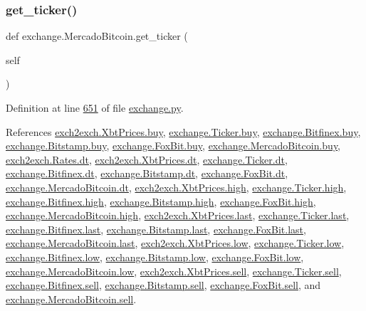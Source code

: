\subsubsection{\texorpdfstring{get\+\_\+ticker()}{get\_ticker()}}
{\footnotesize\ttfamily def exchange.\+Mercado\+Bitcoin.\+get\+\_\+ticker (\begin{DoxyParamCaption}\item[{}]{self }\end{DoxyParamCaption})}



Definition at line \hyperlink{exchange_8py_source_l00651}{651} of file \hyperlink{exchange_8py_source}{exchange.\+py}.



References \hyperlink{exch2exch_8py_source_l00059}{exch2exch.\+Xbt\+Prices.\+buy}, \hyperlink{exchange_8py_source_l00060}{exchange.\+Ticker.\+buy}, \hyperlink{exchange_8py_source_l00430}{exchange.\+Bitfinex.\+buy}, \hyperlink{exchange_8py_source_l00502}{exchange.\+Bitstamp.\+buy}, \hyperlink{exchange_8py_source_l00574}{exchange.\+Fox\+Bit.\+buy}, \hyperlink{exchange_8py_source_l00642}{exchange.\+Mercado\+Bitcoin.\+buy}, \hyperlink{exch2exch_8py_source_l00028}{exch2exch.\+Rates.\+dt}, \hyperlink{exch2exch_8py_source_l00057}{exch2exch.\+Xbt\+Prices.\+dt}, \hyperlink{exchange_8py_source_l00059}{exchange.\+Ticker.\+dt}, \hyperlink{exchange_8py_source_l00437}{exchange.\+Bitfinex.\+dt}, \hyperlink{exchange_8py_source_l00509}{exchange.\+Bitstamp.\+dt}, \hyperlink{exchange_8py_source_l00573}{exchange.\+Fox\+Bit.\+dt}, \hyperlink{exchange_8py_source_l00649}{exchange.\+Mercado\+Bitcoin.\+dt}, \hyperlink{exch2exch_8py_source_l00061}{exch2exch.\+Xbt\+Prices.\+high}, \hyperlink{exchange_8py_source_l00062}{exchange.\+Ticker.\+high}, \hyperlink{exchange_8py_source_l00432}{exchange.\+Bitfinex.\+high}, \hyperlink{exchange_8py_source_l00504}{exchange.\+Bitstamp.\+high}, \hyperlink{exchange_8py_source_l00576}{exchange.\+Fox\+Bit.\+high}, \hyperlink{exchange_8py_source_l00644}{exchange.\+Mercado\+Bitcoin.\+high}, \hyperlink{exch2exch_8py_source_l00063}{exch2exch.\+Xbt\+Prices.\+last}, \hyperlink{exchange_8py_source_l00064}{exchange.\+Ticker.\+last}, \hyperlink{exchange_8py_source_l00434}{exchange.\+Bitfinex.\+last}, \hyperlink{exchange_8py_source_l00506}{exchange.\+Bitstamp.\+last}, \hyperlink{exchange_8py_source_l00578}{exchange.\+Fox\+Bit.\+last}, \hyperlink{exchange_8py_source_l00646}{exchange.\+Mercado\+Bitcoin.\+last}, \hyperlink{exch2exch_8py_source_l00062}{exch2exch.\+Xbt\+Prices.\+low}, \hyperlink{exchange_8py_source_l00063}{exchange.\+Ticker.\+low}, \hyperlink{exchange_8py_source_l00433}{exchange.\+Bitfinex.\+low}, \hyperlink{exchange_8py_source_l00505}{exchange.\+Bitstamp.\+low}, \hyperlink{exchange_8py_source_l00577}{exchange.\+Fox\+Bit.\+low}, \hyperlink{exchange_8py_source_l00645}{exchange.\+Mercado\+Bitcoin.\+low}, \hyperlink{exch2exch_8py_source_l00058}{exch2exch.\+Xbt\+Prices.\+sell}, \hyperlink{exchange_8py_source_l00061}{exchange.\+Ticker.\+sell}, \hyperlink{exchange_8py_source_l00431}{exchange.\+Bitfinex.\+sell}, \hyperlink{exchange_8py_source_l00503}{exchange.\+Bitstamp.\+sell}, \hyperlink{exchange_8py_source_l00575}{exchange.\+Fox\+Bit.\+sell}, and \hyperlink{exchange_8py_source_l00643}{exchange.\+Mercado\+Bitcoin.\+sell}.


